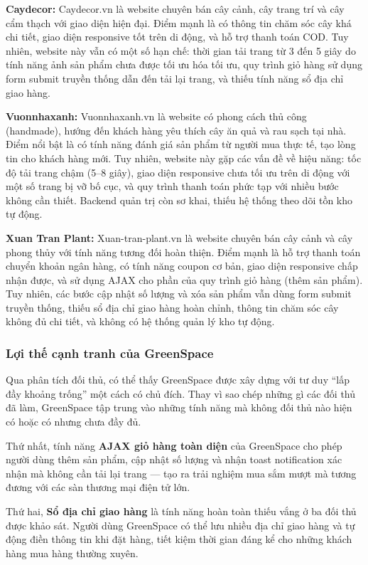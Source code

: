 \documentclass[11pt, a4paper]{article}
\begin{document}
\textbf{Caydecor:} Caydecor.vn là website chuyên bán cây cảnh, cây trang trí và cây cẩm thạch với giao diện hiện đại. Điểm mạnh là có thông tin chăm sóc cây khá chi tiết, giao diện responsive tốt trên di động, và hỗ trợ thanh toán COD. Tuy nhiên, website này vẫn có một số hạn chế: thời gian tải trang từ 3 đến 5 giây do tính năng ảnh sản phẩm chưa được tối ưu hóa tối ưu, quy trình giỏ hàng sử dụng form submit truyền thống dẫn đến tải lại trang, và thiếu tính năng sổ địa chỉ giao hàng.

\textbf{Vuonnhaxanh:} Vuonnhaxanh.vn là website có phong cách thủ công (handmade), hướng đến khách hàng yêu thích cây ăn quả và rau sạch tại nhà. Điểm nổi bật là có tính năng đánh giá sản phẩm từ người mua thực tế, tạo lòng tin cho khách hàng mới. Tuy nhiên, website này gặp các vấn đề về hiệu năng: tốc độ tải trang chậm (5--8 giây), giao diện responsive chưa tối ưu trên di động với một số trang bị vỡ bố cục, và quy trình thanh toán phức tạp với nhiều bước không cần thiết. Backend quản trị còn sơ khai, thiếu hệ thống theo dõi tồn kho tự động.

\textbf{Xuan Tran Plant:} Xuan-tran-plant.vn là website chuyên bán cây cảnh và cây phong thủy với tính năng tương đối hoàn thiện. Điểm mạnh là hỗ trợ thanh toán chuyển khoản ngân hàng, có tính năng coupon cơ bản, giao diện responsive chấp nhận được, và sử dụng AJAX cho phần của quy trình giỏ hàng (thêm sản phẩm). Tuy nhiên, các bước cập nhật số lượng và xóa sản phẩm vẫn dùng form submit truyền thống, thiếu sổ địa chỉ giao hàng hoàn chỉnh, thông tin chăm sóc cây không đủ chi tiết, và không có hệ thống quản lý kho tự động.

\subsubsection{Lợi thế cạnh tranh của GreenSpace}

Qua phân tích đối thủ, có thể thấy GreenSpace được xây dựng với tư duy ``lấp đầy khoảng trống'' một cách có chủ đích. Thay vì sao chép những gì các đối thủ đã làm, GreenSpace tập trung vào những tính năng mà không đối thủ nào hiện có hoặc có nhưng chưa đầy đủ.

Thứ nhất, tính năng \textbf{AJAX giỏ hàng toàn diện} của GreenSpace cho phép người dùng thêm sản phẩm, cập nhật số lượng và nhận toast notification xác nhận mà không cần tải lại trang --- tạo ra trải nghiệm mua sắm mượt mà tương đương với các sàn thương mại điện tử lớn.

Thứ hai, \textbf{Sổ địa chỉ giao hàng} là tính năng hoàn toàn thiếu vắng ở ba đối thủ được khảo sát. Người dùng GreenSpace có thể lưu nhiều địa chỉ giao hàng và tự động điền thông tin khi đặt hàng, tiết kiệm thời gian đáng kể cho những khách hàng mua hàng thường xuyên.
\end{document}
